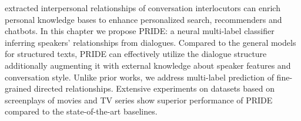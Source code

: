 
extracted
interpersonal relationships of conversation interlocutors
can enrich
personal knowledge bases  
to enhance personalized search, recommenders and chatbots.
In this chapter we propose PRIDE: a
neural multi-label classifier inferring speakers' relationships from dialogues.
Compared to the general models for structured texts,
PRIDE can effectively utilize the dialogue structure additionally augmenting it with external knowledge about 
speaker features and conversation style.
Unlike 
prior works,
we 
address 
multi-label prediction of fine-grained directed relationships. Extensive experiments on datasets based on screenplays of movies and TV series show superior performance of PRIDE compared to the state-of-the-art baselines.